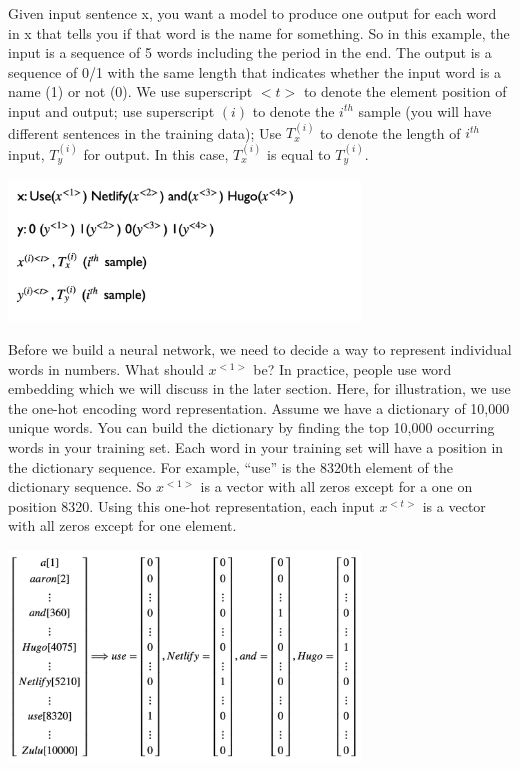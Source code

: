 \documentclass[
  12pt,
]{krantz}
\begin{document}
Given input sentence x, you want a model to produce one output for each word in x that tells you if that word is the name for something. So in this example, the input is a sequence of 5 words including the period in the end. The output is a sequence of 0/1 with the same length that indicates whether the input word is a name (1) or not (0). We use superscript \(<t>\) to denote the element position of input and output; use superscript \((i)\) to denote the \(i^{th}\) sample (you will have different sentences in the training data); Use \(T_x^{(i)}\) to denote the length of \(i^{th}\) input, \(T_y^{(i)}\) for output. In this case, \(T_x^{(i)}\) is equal to \(T_y^{(i)}\).

\includegraphics[width=0.7\textwidth,height=\textheight]{images/rnn_notation.png}

Before we build a neural network, we need to decide a way to represent individual words in numbers. What should \(x^{<1>}\) be? In practice, people use word embedding which we will discuss in the later section. Here, for illustration, we use the one-hot encoding word representation. Assume we have a dictionary of 10,000 unique words. You can build the dictionary by finding the top 10,000 occurring words in your training set. Each word in your training set will have a position in the dictionary sequence. For example, ``use'' is the 8320th element of the dictionary sequence. So \(x^{<1>}\) is a vector with all zeros except for a one on position 8320. Using this one-hot representation, each input \(x^{<t>}\) is a vector with all zeros except for one element.

\includegraphics[width=0.7\textwidth,height=\textheight]{images/nn_ohe.png}
\end{document}

